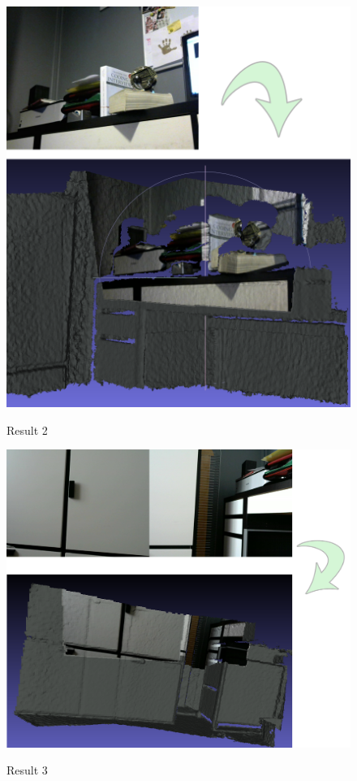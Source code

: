 \begin{figure}
\caption{Result 2}
\centering
    \includegraphics[width=1.0\textwidth]{images/result2.png}
\label{fig:result2}
\end{figure}

\begin{figure}
\caption{Result 3}
\centering
    \includegraphics[width=1.0\textwidth]{images/result3.png}
\label{fig:result3}
\end{figure}

